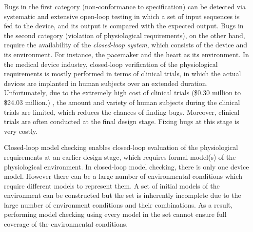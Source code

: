 Bugs in the first category (non-conformance to specification) can be detected via systematic and extensive open-loop testing in which a set of input sequences is fed to the device, and its output is compared with the expected output.
Bugs in the second category (violation of physiological requirements), on the other hand, require the availability of the \emph{closed-loop system}, which consists of the device and its environment.
For instance, the pacemaker and the heart as its environment. 
In the medical device industry, closed-loop verification of the physiological requirements is mostly performed in terms of clinical trials, in which the actual devices are implanted in human subjects over an extended duration.
Unfortunately, due to the extremely high cost of clinical trials (\$0.30
million to \$24.03 million.\cite{trial_cost}) , the amount and variety of human subjects during the clinical trials are limited, which reduces the chances of finding bugs. 
Moreover, clinical trials are often conducted at the final design stage. Fixing bugs at this stage is very costly.

Closed-loop model checking enables closed-loop evaluation of the physiological requirements at an earlier design stage, which requires formal model(s) of the physiological environment. 
In closed-loop model checking, there is only one device model. 
However there can be a large number of environmental conditions which require different models to represent them.
A set of initial models of the environment can be constructed but the set is inherently incomplete due to the large number of environment conditions and their combinations. 
As a result, performing model checking using every model in the set cannot ensure full coverage of the environmental conditions. 

